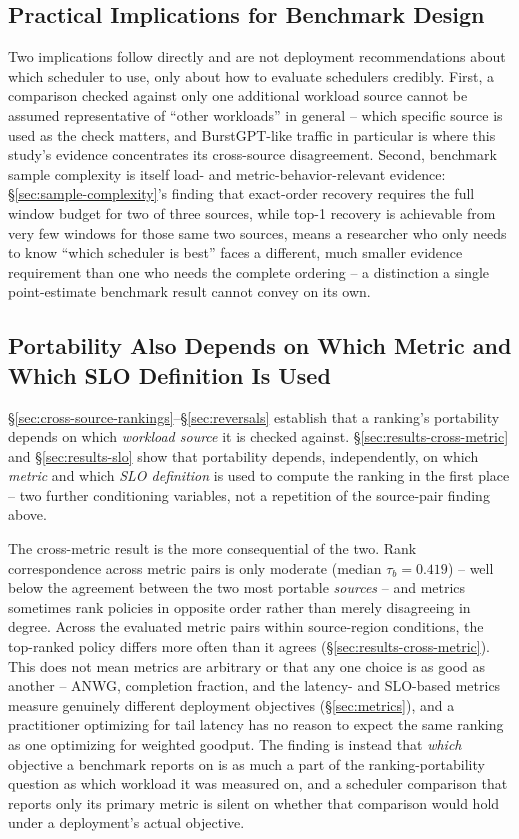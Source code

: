 \subsection{Practical Implications for Benchmark Design}

Two implications follow directly and are not deployment recommendations
about which scheduler to use, only about how to evaluate schedulers
credibly. First, a comparison checked against only one additional workload
source cannot be assumed representative of ``other workloads'' in
general -- which specific source is used as the check matters, and
BurstGPT-like traffic in particular is where this study's evidence
concentrates its cross-source disagreement. Second, benchmark sample
complexity is itself load- and metric-behavior-relevant evidence:
\S\ref{sec:sample-complexity}'s finding that exact-order recovery requires
the full window budget for two of three sources, while top-1 recovery is
achievable from very few windows for those same two sources, means a
researcher who only needs to know ``which scheduler is best'' faces a
different, much smaller evidence requirement than one who needs the
complete ordering -- a distinction a single point-estimate benchmark
result cannot convey on its own.

\subsection{Portability Also Depends on Which Metric and Which SLO
Definition Is Used}

\S\ref{sec:cross-source-rankings}--\S\ref{sec:reversals} establish that a
ranking's portability depends on which \emph{workload source} it is checked
against. \S\ref{sec:results-cross-metric} and \S\ref{sec:results-slo} show
that portability depends, independently, on which \emph{metric} and which
\emph{SLO definition} is used to compute the ranking in the first place --
two further conditioning variables, not a repetition of the source-pair
finding above.

The cross-metric result is the more consequential of the two. Rank
correspondence across metric pairs is only moderate (median
$\tau_b = 0.419$) -- well below the agreement between the two most portable
\emph{sources} -- and metrics sometimes rank policies in opposite order
rather than merely disagreeing in degree. Across the evaluated metric pairs
within source-region conditions, the top-ranked policy differs more often
than it agrees (\S\ref{sec:results-cross-metric}).
This does not mean
metrics are arbitrary or that any one choice is as good as another -- ANWG,
completion fraction, and the latency- and SLO-based metrics measure
genuinely different deployment objectives (\S\ref{sec:metrics}), and a
practitioner optimizing for tail latency has no reason to expect the same
ranking as one optimizing for weighted goodput. The finding is instead that
\emph{which} objective a benchmark reports on is as much a part of the
ranking-portability question as which workload it was measured on, and a
scheduler comparison that reports only its primary metric is silent on
whether that comparison would hold under a deployment's actual objective.

